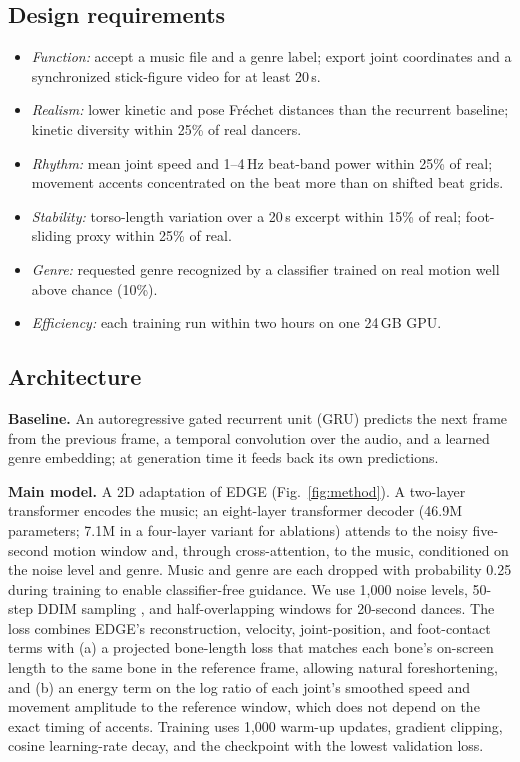 \documentclass[conference,letterpaper]{IEEEtran}
\begin{document}
\subsection{Design requirements}
\begin{itemize}
\item \emph{Function:} accept a music file and a genre label; export joint coordinates and a synchronized stick-figure video for at least 20\,s.
\item \emph{Realism:} lower kinetic and pose Fr\'echet distances than the recurrent baseline; kinetic diversity within 25\% of real dancers.
\item \emph{Rhythm:} mean joint speed and 1--4\,Hz beat-band power within 25\% of real; movement accents concentrated on the beat more than on shifted beat grids.
\item \emph{Stability:} torso-length variation over a 20\,s excerpt within 15\% of real; foot-sliding proxy within 25\% of real.
\item \emph{Genre:} requested genre recognized by a classifier trained on real motion well above chance (10\%).
\item \emph{Efficiency:} each training run within two hours on one 24\,GB GPU.
\end{itemize}

\subsection{Architecture}
\textbf{Baseline.} An autoregressive gated recurrent unit (GRU) predicts the next frame from the previous frame, a temporal convolution over the audio, and a learned genre embedding; at generation time it feeds back its own predictions.

\textbf{Main model.} A 2D adaptation of EDGE \cite{tseng2023} (Fig.~\ref{fig:method}). A two-layer transformer encodes the music; an eight-layer transformer decoder (46.9M parameters; 7.1M in a four-layer variant for ablations) attends to the noisy five-second motion window and, through cross-attention, to the music, conditioned on the noise level and genre. Music and genre are each dropped with probability 0.25 during training to enable classifier-free guidance. We use 1,000 noise levels, 50-step DDIM sampling \cite{song2021}, and half-overlapping windows for 20-second dances. The loss combines EDGE's reconstruction, velocity, joint-position, and foot-contact terms with (a) a projected bone-length loss that matches each bone's on-screen length to the same bone in the reference frame, allowing natural foreshortening, and (b) an energy term on the log ratio of each joint's smoothed speed and movement amplitude to the reference window, which does not depend on the exact timing of accents. Training uses 1,000 warm-up updates, gradient clipping, cosine learning-rate decay, and the checkpoint with the lowest validation loss.
\end{document}
